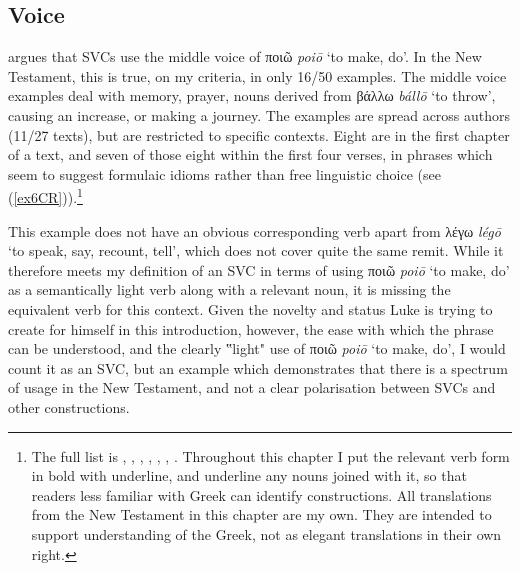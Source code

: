 \documentclass[output=paper,colorlinks,citecolor=brown]{langscibook}
\begin{document}
\subsection{Voice}\label{voice}

\citet{jimenez_lopez_support_2016} argues that SVCs use the middle voice of ποιῶ \textit{poiō} ‘to make, do'. 
In the New Testament, this is true, on my criteria, in
only 16/50 examples. 
The middle voice examples deal with memory, prayer,
nouns derived from βάλλω \textit{bállō} ‘to throw', causing an increase, or
making a journey. 
The examples are spread across authors (11/27 texts),
but are restricted to specific contexts. 
Eight are in the first chapter
of a text, and seven of those eight within the first four verses, in
phrases which seem to suggest formulaic idioms rather than free
linguistic choice (see (\ref{ex6CR})).\footnote{The full list is ,
  , , , , , . Throughout this chapter I put the relevant verb form in bold with underline, and underline any nouns joined with it, so that readers less familiar with Greek can identify constructions. All translations from the New Testament in this chapter are my own. They are intended to support understanding of the Greek, not as elegant translations in their own right.}
  

This example does not have an obvious corresponding verb apart from λέγω
\textit{légō} ‘to speak, say, recount, tell', which does not cover quite the
same remit. While it therefore meets my definition of an SVC in terms of
using ποιῶ \textit{poiō} ‘to make, do' as a semantically light verb along with a relevant noun, it
is missing the equivalent verb for this context. 
Given the novelty and
status Luke is trying to create for himself in this introduction,
however, the ease with which the phrase can be understood, and the
clearly ‟light" use of ποιῶ \textit{poiō} ‘to make, do', I would count it as an SVC, but
an example which demonstrates that there is a spectrum of usage in the
New Testament, and not a clear polarisation between SVCs and other
constructions.
\end{document}
